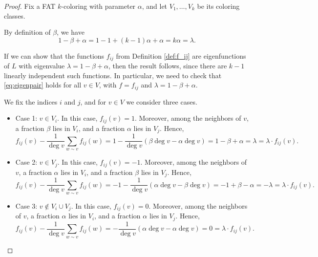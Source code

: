 \documentclass[10pt,a4paper]{amsart}
\begin{document}
\begin{proof}
Fix a FAT $k$-coloring with parameter $\alpha$, and let $V_1,\ldots,V_k$ be its coloring classes. \newline

By definition of $\beta$, we have 
$$
1-\beta+\alpha = 1-1+ (k-1)\alpha + \alpha = k\alpha = \lambda.
$$

If we can show that the functions $f_{ij}$ from Definition \ref{def:f_ij} are eigenfunctions of $L$ with eigenvalue $\lambda=1-\beta+\alpha$, then the result follows, since there are $k-1$ linearly independent such functions. In particular, we need to check that \eqref{eq:eigenpair} holds for all $v\in V$, with $f=f_{ij}$ and $\lambda=1-\beta+\alpha$.\newline

We fix the indices $i$ and $j$, and for $v\in V$ we consider three cases.

\begin{itemize}

\item Case 1: $v\in V_i$. In this case, $f_{ij}(v)=1$. Moreover, among the neighbors of $v$, a fraction $\beta$ lies in $V_i$, and a fraction $\alpha$ lies in $V_j$. Hence,
$$
f_{ij}(v)-\frac{1}{\deg v}\sum_{w\sim v}f_{ij}(w)=1-\frac{1}{\deg v}\left(\beta \deg v- \alpha \deg v \right)=1-\beta + \alpha = \lambda = \lambda \cdot f_{ij}(v).
$$
    
    \item Case 2: $v\in V_j$. In this case, $f_{ij}(v)=-1$. Moreover, among the neighbors of $v$, a fraction $\alpha$ lies in $V_i$, and a fraction $\beta$ lies in $V_j$. Hence,
$$
f_{ij}(v)-\frac{1}{\deg v}\sum_{w\sim v}f_{ij}(w)=-1-\frac{1}{\deg v}\left(\alpha \deg v- \beta \deg v \right)=-1+\beta - \alpha = -\lambda = \lambda \cdot f_{ij}(v).
$$

    
    \item Case 3: $v\notin V_i\cup V_j$. In this case, $f_{ij}(v)=0$. Moreover, among the neighbors of $v$, a fraction $\alpha$ lies in $V_i$, and a fraction $\alpha$ lies in $V_j$. Hence,
$$
f_{ij}(v)-\frac{1}{\deg v}\sum_{w\sim v}f_{ij}(w)=-\frac{1}{\deg v}\left(\alpha \deg v- \alpha \deg v \right)=0=\lambda \cdot f_{ij}(v).
$$

    
\end{itemize}



\end{proof}
\end{document}
